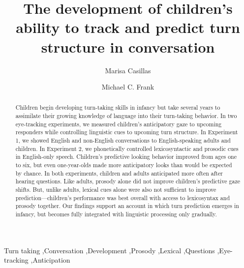 \documentclass[authoryear, 12pt]{elsarticle}
\begin{document}
\begin{frontmatter}

\title{The development of children's ability to track and predict turn structure in conversation}

\author[MPI]{Marisa Casillas}
\address[MPI]{Max Planck Institute for Psycholinguistics, Nijmegen}

\author[StanfordPSY]{Michael C. Frank}

\address[StanfordPSY]{Department of Psychology, Stanford University}

\begin{abstract}
Children begin developing turn-taking skills in infancy but take several years to assimilate their growing knowledge of language into their turn-taking behavior. In two eye-tracking experiments, we measured children's anticipatory gaze to upcoming responders while controlling linguistic cues to upcoming turn structure. In Experiment 1, we showed English and non-English conversations to English-speaking adults and children.
In Experiment 2, we phonetically controlled lexicosyntactic and prosodic cues in English-only speech. 
Children's predictive looking behavior improved from ages one to six, but even one-year-olds made more anticipatory looks than would be expected by chance.
In both experiments, children and adults anticipated more often after hearing questions. 
Like adults, prosody alone did not improve children's predictive gaze shifts. But, unlike adults, lexical cues alone were also not sufficient to improve prediction---children's performance was best overall with access to lexicosyntax and prosody together. Our findings support an account in which turn prediction emerges in infancy, but becomes fully integrated with linguistic processing only gradually. 
\end{abstract}

\begin{keyword}
Turn taking \sep Conversation \sep Development \sep Prosody \sep Lexical \sep Questions \sep Eye-tracking \sep Anticipation

\end{keyword}

\end{frontmatter}
\end{document}

